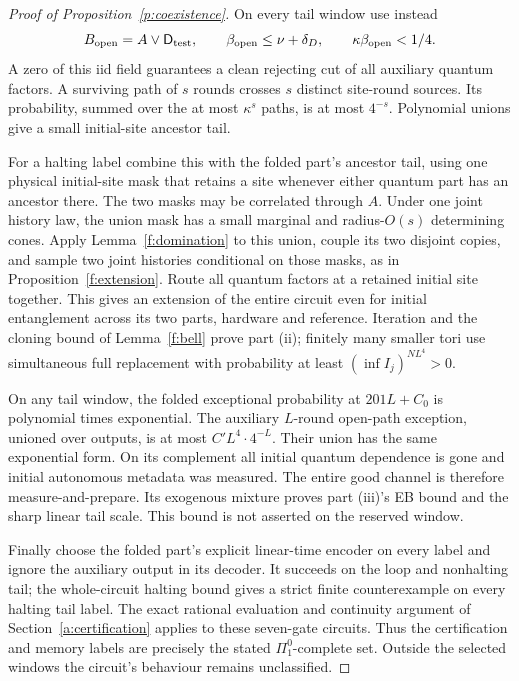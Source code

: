 \begin{proof}[Proof of Proposition~\ref{p:coexistence}]
On every tail window use instead
\[
 B_{\rm open}=A\lor \mathsf D_{\rm test},\qquad
 \beta_{\rm open}\le\nu+\delta_D,
 \qquad\kappa\beta_{\rm open}<1/4.
\]
A zero of this iid field guarantees a clean rejecting cut of all
auxiliary quantum factors. A surviving path of \(s\) rounds crosses
\(s\) distinct site-round sources. Its probability, summed over the
at most \(\kappa^s\) paths, is at most \(4^{-s}\). Polynomial
unions give a small initial-site ancestor tail.

For a halting label combine this with the folded part's ancestor
tail, using one physical initial-site mask that retains a site whenever
either quantum part has an ancestor there. The two masks may be
correlated through \(A\). Under one joint history law,
the union mask has a small marginal and radius-\(O(s)\) determining
cones. Apply Lemma~\ref{f:domination} to this union, couple its two
disjoint copies, and sample two joint histories conditional
on those masks, as in Proposition~\ref{f:extension}. Route all
quantum factors at a retained initial site together. This gives an
extension of the entire circuit even for initial entanglement across
its two parts, hardware and reference. Iteration and the cloning bound of Lemma~\ref{f:bell} prove part (ii); finitely many smaller tori use simultaneous full
replacement with probability at least \((\inf I_j)^{NL^4}>0\).

On any tail window, the folded exceptional probability at
\(201L+C_0\) is polynomial times exponential. The auxiliary
\(L\)-round open-path exception, unioned over outputs, is at most
\(C'L^4\cdot4^{-L}\). Their union has the same exponential form.
On its complement all initial quantum dependence is gone and initial
autonomous metadata was measured. The entire good channel is therefore
measure-and-prepare. Its exogenous mixture proves part (iii)'s EB
bound and the sharp linear tail scale. This bound is not asserted
on the reserved window.

Finally choose the folded part's explicit linear-time encoder on
every label and ignore the auxiliary output in its decoder. It succeeds
on the loop and nonhalting tail; the whole-circuit halting bound gives
a strict finite counterexample on every halting tail label. The exact
rational evaluation and continuity argument of
Section~\ref{a:certification} applies to these seven-gate circuits.
Thus the certification and memory labels are precisely the stated
\(\Pi^0_1\)-complete set. Outside the selected windows the circuit's behaviour remains unclassified.
\end{proof}
